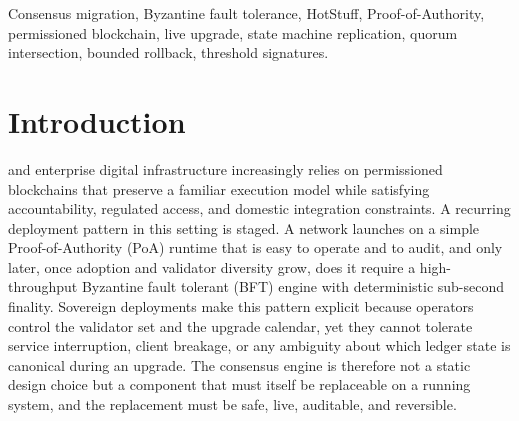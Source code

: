\documentclass[journal]{IEEEtran}
\begin{document}
\begin{abstract}
cutover-evidence latency of 105.2 microseconds in simulator time. Across the partition
matrix a disjoint-quorum exposure metric separates the strategies: under a cutover-straddling
balanced partition, hard fork and blind cutover are exposed to a fork window in every trial
while SAGE's certified cutover keeps exposure at zero. Because the serialized simulator cannot
realize a concurrent two-leader conflict, we additionally drive the real engines in the
multi-process testbed under an identical balanced partition at the cutover height: the
ungated control forks in every run while quorum-gated SAGE forks in none, so the
fork SAGE prevents is exhibited as a measured event rather than a structural impossibility.
A bounded model check exhaustively verifies cross-boundary safety, cutover-decision
uniqueness, and no-absolute-reversion over $n\in\{4,7,10\}$ and all partition splits, with
falsifying broken controls the checker must catch. The local runtime additionally exercises
SAGE cutover, post-cutover HotStuff finalization, store-backed double-vote rejection, and
restart/continue recovery from in-memory snapshots.
\end{abstract}

\begin{IEEEkeywords}
Consensus migration, Byzantine fault tolerance, HotStuff, Proof-of-Authority, permissioned
blockchain, live upgrade, state machine replication, quorum intersection, bounded
rollback, threshold signatures.
\end{IEEEkeywords}

\section{Introduction}
 and enterprise digital infrastructure increasingly relies on
permissioned blockchains that preserve a familiar execution model while satisfying
accountability, regulated access, and domestic integration constraints. A recurring
deployment pattern in this setting is staged. A network launches on a simple
Proof-of-Authority (PoA) runtime that is easy to operate and to audit, and only later,
once adoption and validator diversity grow, does it require a high-throughput Byzantine
fault tolerant (BFT) engine with deterministic sub-second finality. Sovereign deployments
make this pattern explicit because operators control the validator set and the upgrade
calendar, yet they cannot tolerate service interruption, client breakage, or any
ambiguity about which ledger state is canonical during an upgrade. The consensus engine is
therefore not a static design choice but a component that must itself be replaceable on a
running system, and the replacement must be safe, live, auditable, and reversible.
\end{document}
